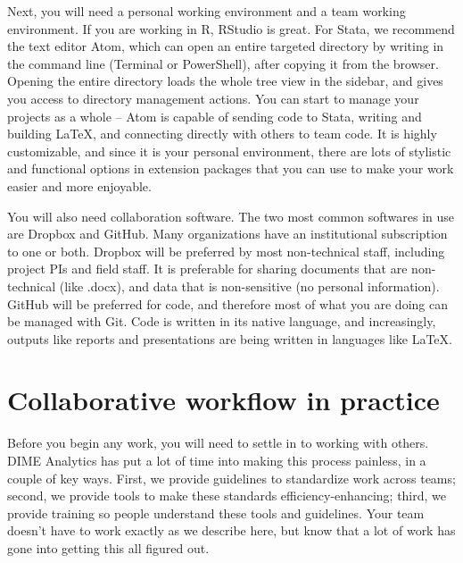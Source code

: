 Next, you will need a personal working environment and a team working environment.
If you are working in R, RStudio is great.
For Stata, we recommend the text editor Atom,
which can open an entire targeted directory by writing 
in the command line (Terminal or PowerShell), after copying it from the browser.
Opening the entire directory loads the whole tree view in the sidebar,
and gives you access to directory management actions.
You can start to manage your projects as a whole --
Atom is capable of sending code to Stata,
writing and building \LaTeX,
and connecting directly with others to team code.
It is highly customizable, and since it is your personal environment,
there are lots of stylistic and functional options in extension packages
that you can use to make your work easier and more enjoyable.

You will also need collaboration software.
The two most common softwares in use are Dropbox and GitHub.
Many organizations have an institutional subscription to one or both.
Dropbox will be preferred by most non-technical staff,
including project PIs and field staff.
It is preferable for sharing documents that are non-technical (like .docx),
and data that is non-sensitive (no personal information).
GitHub will be preferred for code,
and therefore most of what you are doing can be managed with Git.
Code is written in its native language,
and increasingly, outputs like reports
and presentations
are being written in languages like \LaTeX.


\section{Collaborative workflow in practice}

Before you begin any work, you will need to settle in to working with others.
DIME Analytics has put a lot of time into making this process painless,
in a couple of key ways.
First, we provide guidelines to standardize work across teams;
second, we provide tools to make these standards efficiency-enhancing;
third, we provide training so people understand these tools and guidelines.
Your team doesn't have to work exactly as we describe here,
but know that a lot of work has gone into getting this all figured out.

